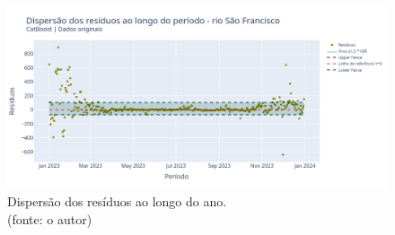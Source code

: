 %
%
%
%

\begin{figure}[!h]
	\centering
	\includegraphics[scale=0.33]{Figuras/rio_sao_francisco/wfv/CB/CB_WFV_ORIG_RESID_x_TEMPO.png}
	\caption{Dispersão dos resíduos ao longo do ano.\\(fonte: o autor)}
	\label{fig:francisco_CB_WFV_ORIG_RESID_x_TEMPO}
\end{figure}

